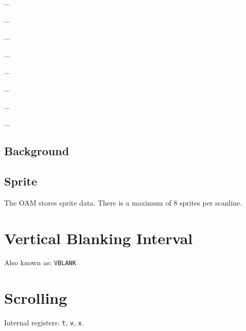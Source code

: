  ... 

 ... 

 ... 

 ... 

 ... 

 ... 

 ... 

 ... 

\subsection{Background}

\subsection{Sprite}

The OAM stores sprite data.
There is a maximum of 8 sprites per scanline.

\section{Vertical Blanking Interval}

Also known as: \texttt{VBLANK}

\section{Scrolling}

Internal registers: \texttt{t}, \texttt{v}, \texttt{x}.
